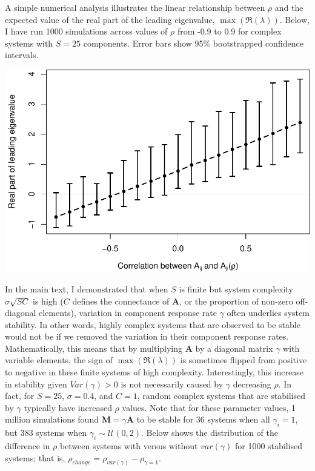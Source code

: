 \documentclass[]{article}
\begin{document}
A simple numerical analysis illustrates the linear relationship between
\(\rho\) and the expected value of the real part of the leading
eigenvalue, \(\max(\Re(\lambda))\). Below, I have run 1000 simulations
across values of \(\rho\) from -0.9 to 0.9 for complex systems with
\(S = 25\) components. Error bars show 95\% bootstrapped confidence
intervals.

\includegraphics{revision_notes_files/figure-latex/unnamed-chunk-4-1.pdf}

In the main text, I demonstrated that when \(S\) is finite but system
complexity \(\sigma\sqrt{SC}\) is high (\(C\) defines the connectance of
\(\textbf{A}\), or the proportion of non-zero off-diagonal elements),
variation in component response rate \(\gamma\) often underlies system
stability. In other words, highly complex systems that are observed to
be stable would not be if we removed the variation in their component
response rates. Mathematically, this means that by multiplying
\(\textbf{A}\) by a diagonal matrix \(\gamma\) with variable elements,
the sign of \(\max(\Re(\lambda))\) is sometimes flipped from positive to
negative in these finite systems of high complexity. Interestingly, this
increase in stability given \(Var(\gamma) > 0\) is not necessarily
caused by \(\gamma\) decreasing \(\rho\). In fact, for \(S = 25\),
\(\sigma = 0.4\), and \(C = 1\), random complex systems that are
stabilised by \(\gamma\) typically have increased \(\rho\) values. Note
that for these parameter values, 1 million simulations found
\(\textbf{M} = \gamma \textbf{A}\) to be stable for 36 systems when all
\(\gamma_{i} = 1\), but 383 systems when
\(\gamma_{i} \sim \mathcal{U}(0, 2)\). Below shows the distribution of
the difference in \(\rho\) between systems with versus without
\(var(\gamma)\) for 1000 stabilised systems; that is,
\(\rho_{change} = \rho_{var(\gamma)} - \rho_{\gamma = 1}\).
\end{document}
